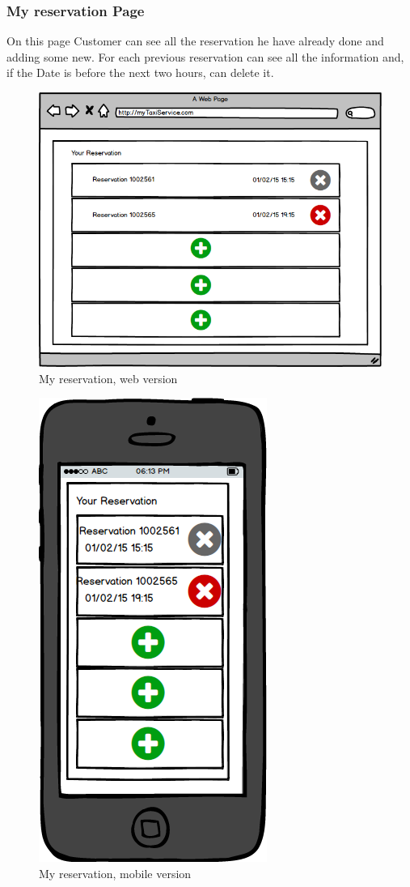 \documentclass{report}
\begin{document}
			\subsubsection{My reservation Page}
			On this page Customer can see all the reservation he have already done and adding some new. For each previous reservation can see all the information and, if the Date is before the 				next two hours, can delete it.			
			\begin{figure}[H]
			\centering
			\includegraphics[scale=0.5]{IMG/UserInterfaces/myReservation.png}
			\caption{My reservation, web version}\label{visina8}
			\end{figure}
			\begin{figure}[H]
			\centering
			\includegraphics[scale=0.4]{IMG/UserInterfaces/myReservation_m.png}
			\caption{My reservation, mobile version}\label{visina8}
			\end{figure}
			
\end{document}
